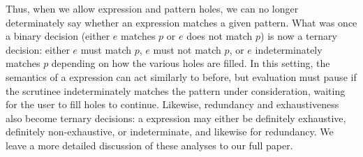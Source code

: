 
Thus, when we allow expression and pattern holes, we can no longer determinately say whether an expression matches a given pattern. What was once a binary decision (either $e$ matches $p$ or $e$ does not match $p$) is now a ternary decision: either $e$ must match $p$, $e$ must not match $p$, or $e$ indeterminately matches $p$ depending on how the various holes are filled. In this setting, the semantics of a  expression can act similarly to before, but evaluation must pause if the scrutinee indeterminately matches the pattern under consideration, waiting for the user to fill holes to continue.
Likewise, redundancy and exhaustiveness also become ternary decisions: a  expression may either be definitely exhaustive, definitely non-exhaustive, or indeterminate, and likewise for redundancy. We leave a more detailed discussion of these analyses to our full paper. 


